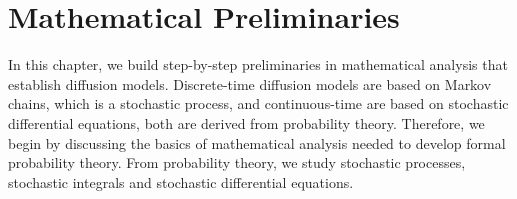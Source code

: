 \chapter{Mathematical Preliminaries}
\thispagestyle{empty}
In this chapter, we build step-by-step preliminaries in mathematical analysis that establish diffusion models. Discrete-time diffusion models are based on Markov chains, which is a stochastic process, and continuous-time are based on stochastic differential equations, both are derived from probability theory. Therefore, we begin by discussing the basics of mathematical analysis needed to develop formal probability theory. From probability theory, we study stochastic processes, stochastic integrals and stochastic differential equations.







